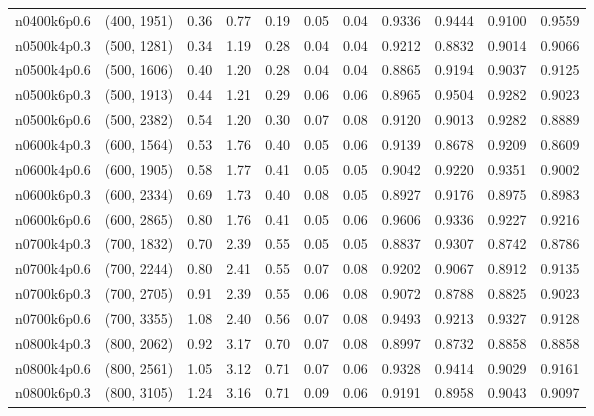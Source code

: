 \begin{tabular}{llrrrrrrrrr}
n0400k6p0.6 &   (400, 1951) &   0.36 &   0.77 &  0.19 &  0.05 &   0.04 &   0.9336 &   0.9444 &     0.9100 &      0.9559 \\
n0500k4p0.3 &   (500, 1281) &   0.34 &   1.19 &  0.28 &  0.04 &   0.04 &   0.9212 &   0.8832 &     0.9014 &      0.9066 \\
n0500k4p0.6 &   (500, 1606) &   0.40 &   1.20 &  0.28 &  0.04 &   0.04 &   0.8865 &   0.9194 &     0.9037 &      0.9125 \\
n0500k6p0.3 &   (500, 1913) &   0.44 &   1.21 &  0.29 &  0.06 &   0.06 &   0.8965 &   0.9504 &     0.9282 &      0.9023 \\
n0500k6p0.6 &   (500, 2382) &   0.54 &   1.20 &  0.30 &  0.07 &   0.08 &   0.9120 &   0.9013 &     0.9282 &      0.8889 \\
n0600k4p0.3 &   (600, 1564) &   0.53 &   1.76 &  0.40 &  0.05 &   0.06 &   0.9139 &   0.8678 &     0.9209 &      0.8609 \\
n0600k4p0.6 &   (600, 1905) &   0.58 &   1.77 &  0.41 &  0.05 &   0.05 &   0.9042 &   0.9220 &     0.9351 &      0.9002 \\
n0600k6p0.3 &   (600, 2334) &   0.69 &   1.73 &  0.40 &  0.08 &   0.05 &   0.8927 &   0.9176 &     0.8975 &      0.8983 \\
n0600k6p0.6 &   (600, 2865) &   0.80 &   1.76 &  0.41 &  0.05 &   0.06 &   0.9606 &   0.9336 &     0.9227 &      0.9216 \\
n0700k4p0.3 &   (700, 1832) &   0.70 &   2.39 &  0.55 &  0.05 &   0.05 &   0.8837 &   0.9307 &     0.8742 &      0.8786 \\
n0700k4p0.6 &   (700, 2244) &   0.80 &   2.41 &  0.55 &  0.07 &   0.08 &   0.9202 &   0.9067 &     0.8912 &      0.9135 \\
n0700k6p0.3 &   (700, 2705) &   0.91 &   2.39 &  0.55 &  0.06 &   0.08 &   0.9072 &   0.8788 &     0.8825 &      0.9023 \\
n0700k6p0.6 &   (700, 3355) &   1.08 &   2.40 &  0.56 &  0.07 &   0.08 &   0.9493 &   0.9213 &     0.9327 &      0.9128 \\
n0800k4p0.3 &   (800, 2062) &   0.92 &   3.17 &  0.70 &  0.07 &   0.08 &   0.8997 &   0.8732 &     0.8858 &      0.8858 \\
n0800k4p0.6 &   (800, 2561) &   1.05 &   3.12 &  0.71 &  0.07 &   0.06 &   0.9328 &   0.9414 &     0.9029 &      0.9161 \\
n0800k6p0.3 &   (800, 3105) &   1.24 &   3.16 &  0.71 &  0.09 &   0.06 &   0.9191 &   0.8958 &     0.9043 &      0.9097 \\

\end{tabular}
